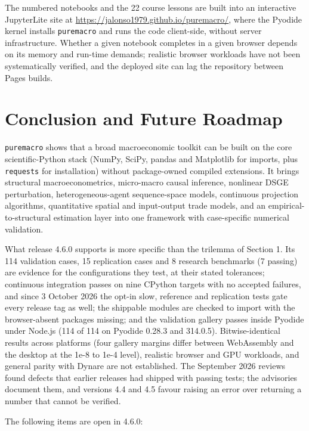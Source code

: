 \documentclass[11pt,letterpaper]{article}
\renewcommand{\_}{\pmunderscore\allowbreak}
\begin{document}
The numbered notebooks and the 22 course lessons are built into an interactive JupyterLite site at \url{https://jalonso1979.github.io/puremacro/}, where the Pyodide kernel installs \texttt{puremacro} and runs the code client-side, without server infrastructure. Whether a given notebook completes in a given browser depends on its memory and run-time demands; realistic browser workloads have not been systematically verified, and the deployed site can lag the repository between Pages builds.

\section{Conclusion and Future Roadmap}\label{conclusion-and-future-roadmap}

\texttt{puremacro} shows that a broad macroeconomic toolkit can be built on the core scientific-Python stack (NumPy, SciPy, pandas and Matplotlib for imports, plus \texttt{requests} for installation) without package-owned compiled extensions. It brings structural macroeconometrics, micro-macro causal inference, nonlinear DSGE perturbation, heterogeneous-agent sequence-space models, continuous projection algorithms, quantitative spatial and input-output trade models, and an empirical-to-structural estimation layer into one framework with case-specific numerical validation.

What release 4.6.0 supports is more specific than the trilemma of Section 1. Its 114 validation cases, 15 replication cases and 8 research benchmarks (7 passing) are evidence for the configurations they test, at their stated tolerances; continuous integration passes on nine CPython targets with no accepted failures, and since 3 October 2026 the opt-in slow, reference and replication tests gate every release tag as well; the shippable modules are checked to import with the browser-absent packages missing; and the validation gallery passes inside Pyodide under Node.js (114 of 114 on Pyodide 0.28.3 and 314.0.5). Bitwise-identical results across platforms (four gallery margins differ between WebAssembly and the desktop at the 1e-8 to 1e-4 level), realistic browser and GPU workloads, and general parity with Dynare are not established. The September 2026 reviews found defects that earlier releases had shipped with passing tests; the advisories document them, and versions 4.4 and 4.5 favour raising an error over returning a number that cannot be verified.

The following items are open in 4.6.0:
\end{document}

